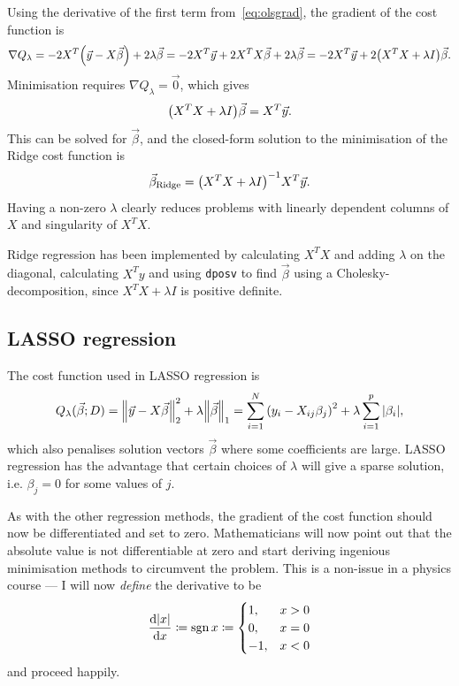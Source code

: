 \documentclass[11pt,british,a4paper]{article}
\DeclareMathOperator{\sgn}{sgn}
\numberwithin{equation}{section}
\begin{document}
Using the derivative of the first term from~\vref{eq:olsgrad}, the gradient of the cost function is
\begin{equation}
    \nabla Q_\lambda = -2 X^T \qty(\vec{y}-X\vec{\beta}) + 2\lambda \vec{\beta}
                     = -2 X^T \vec{y} + 2 X^T X \vec{\beta} + 2\lambda \vec{\beta}
                     = -2 X^T \vec{y} + 2\qty(X^T X + \lambda I)\vec{\beta}.
\end{equation}
Minimisation requires \(\nabla Q_\lambda = \vec{0}\), which gives
\begin{equation}
    \qty(X^T X + \lambda I)\vec{\beta} = X^T \vec{y}.
\end{equation}
This can be solved for \(\vec{\beta}\), and the closed-form solution to the minimisation of the Ridge cost function is
\begin{equation}
    \vec{\beta}_\text{Ridge} = \qty(X^T X + \lambda I)^{-1} X^T \vec{y}.
\end{equation}
Having a non-zero \(\lambda\) clearly reduces problems with linearly dependent columns of \(X\) and singularity of \(X^T X\).

Ridge regression has been implemented by calculating \(X^T X\) and adding \(\lambda\) on the diagonal, calculating \(X^T y\) and using \lstinline{dposv} to find \(\vec{\beta}\) using a Cholesky-decomposition, since \(X^T X + \lambda I\) is positive definite.

\tikzexternaldisable
\subsection{LASSO regression}
The cost function used in LASSO regression is
\begin{equation}
    Q_\lambda(\vec{\beta};D) = \norm{\vec{y}-X\vec{\beta}}_2^2 + \lambda \norm{\vec{\beta}}_1
                             = \sum_{i=1}^N \qty(y_i - X_{ij}\beta_j)^2 + \lambda\sum_{i=1}^p \abs{\beta_i},
\end{equation}
which also penalises solution vectors \(\vec{\beta}\) where some coefficients are large.
LASSO regression has the advantage that certain choices of \(\lambda\) will give a sparse solution, i.e. \(\beta_j=0\) for some values of \(j\)\cite{wieringen}.

As with the other regression methods, the gradient of the cost function should now be differentiated and set to zero.
Mathematicians will now point out that the absolute value is not differentiable at zero and start deriving ingenious minimisation methods to circumvent the problem.
This is a non-issue in a physics course --- I will now \emph{define} the derivative to be
\begin{equation}
    \dv{\abs{x}}{x} \coloneqq \sgn{x} \coloneqq \begin{cases}1, & x > 0\\ 0, & x = 0 \\ -1, & x < 0 \end{cases}
\end{equation}
and proceed happily.
\end{document}
